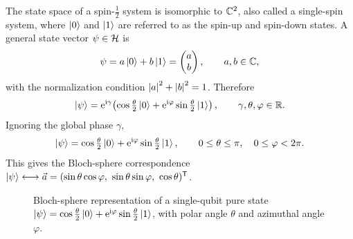 \begin{remark}
The state space of a spin-$\tfrac{1}{2}$ system is isomorphic to $\mathbb{C}^2$, also
called a single-spin system, where $\ket{0}$ and $\ket{1}$ are referred to as the
spin-up and spin-down states. A general state vector $\psi \in \mathcal{H}$ is
\begin{equation}
  \psi = a\ket{0} + b\ket{1} = \begin{pmatrix} a \\ b \end{pmatrix},
  \qquad a, b \in \mathbb{C},
\end{equation}
with the normalization condition $\left\lvert a \right\rvert^2 + \left\lvert b \right\rvert^2 = 1$. Therefore
\begin{equation}
  \ket{\psi} = \mathrm{e}^{\mathrm{i}\gamma}\!\left( \cos\tfrac{\theta}{2}\ket{0}
    + \mathrm{e}^{\mathrm{i}\varphi}\sin\tfrac{\theta}{2}\ket{1} \right),
  \qquad \gamma, \theta, \varphi \in \mathbb{R}.
\end{equation}
Ignoring the global phase $\gamma$,
\begin{equation}
  \ket{\psi} = \cos\tfrac{\theta}{2}\ket{0}
    + \mathrm{e}^{\mathrm{i}\varphi}\sin\tfrac{\theta}{2}\ket{1},
  \qquad 0 \le \theta \le \pi, \quad 0 \le \varphi < 2\pi.
\end{equation}
This gives the Bloch-sphere correspondence
$\ket{\psi} \longleftrightarrow
\vec{a} = (\sin\theta\cos\varphi,\ \sin\theta\sin\varphi,\ \cos\theta)^{\mathsf{T}}$.
\end{remark}

\begin{figure}[ht]
  \centering
  \caption{Bloch-sphere representation of a single-qubit pure state
    $\ket{\psi} = \cos\tfrac{\theta}{2}\ket{0} + \mathrm{e}^{\mathrm{i}\varphi}\sin\tfrac{\theta}{2}\ket{1}$,
    with polar angle $\theta$ and azimuthal angle $\varphi$.}
  \label{fig:sec01-bloch}
\end{figure}

